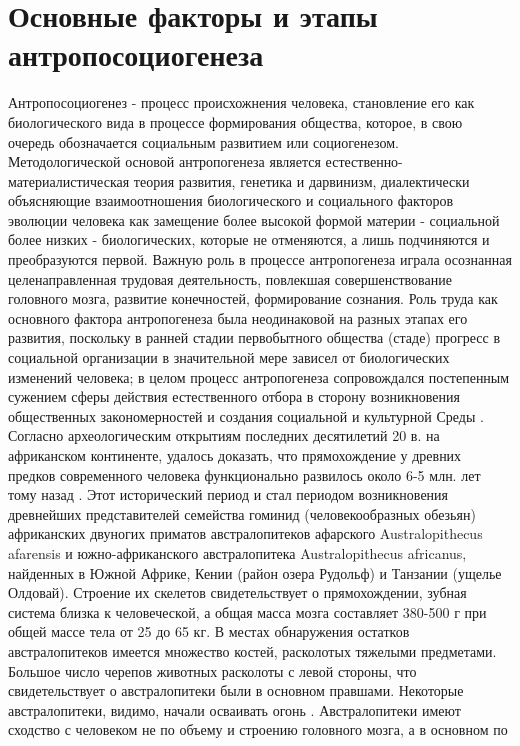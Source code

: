 \documentclass[12pt]{article}
\begin{document}
\newpage
\section{Основные факторы и этапы антропосоциогенеза}
Антропосоциогенез - процесс происхожнения человека, становление его как биологического вида в процессе
формирования  общества,  которое,  в  свою  очередь  обозначается  социальным  развитием  или  социогенезом.
Методологической основой антропогенеза является естественно-материалистическая теория развития, генетика
и  дарвинизм,  диалектически  объясняющие  взаимоотношения  биологического  и  социального  факторов
эволюции человека как замещение более высокой формой материи - социальной более низких - биологических,
которые не отменяются, а лишь подчиняются и преобразуются первой.
Важную роль в процессе антропогенеза играла осознанная целенаправленная трудовая деятельность, повлекшая
совершенствование головного мозга, развитие конечностей, формирование сознания. Роль труда как основного
фактора  антропогенеза  была  неодинаковой  на  разных  этапах  его  развития,  поскольку  в  ранней  стадии 
первобытного  общества  (стаде)  прогресс  в  социальной  организации  в  значительной  мере  зависел  от
биологических изменений человека; в целом процесс антропогенеза сопровождался постепенным сужением
сферы действия естественного отбора в сторону возникновения общественных закономерностей и создания
социальной и культурной Среды . 
Согласно  археологическим  открытиям  последних  десятилетий  20  в.  на  африканском  континенте,  удалось
доказать, что прямохождение у древних предков современного человека функционально развилось около 6-5
млн. лет тому назад . Этот исторический период и стал периодом возникновения древнейших представителей
семейства гоминид (человекообразных обезьян) африканских двуногих приматов австралопитеков афарского
Australopithecus afarensis и южно-африканского австралопитека Australopithecus africanus, найденных в Южной
Африке, Кении (район озера Рудольф) и Танзании (ущелье Олдовай). Строение их скелетов свидетельствует о
прямохождении, зубная система близка к человеческой, а общая масса мозга составляет 380-500 г при общей
массе  тела  от  25  до  65  кг.  В  местах  обнаружения  остатков  австралопитеков  имеется  множество  костей,
расколотых  тяжелыми  предметами.  Большое  число  черепов  животных  расколоты  с  левой  стороны,  что
свидетельствует о австралопитеки были в основном правшами. Некоторые австралопитеки, видимо, начали
осваивать огонь .
Австралопитеки имеют сходство с человеком не по объему и строению головного мозга, а в основном по
\end{document}
